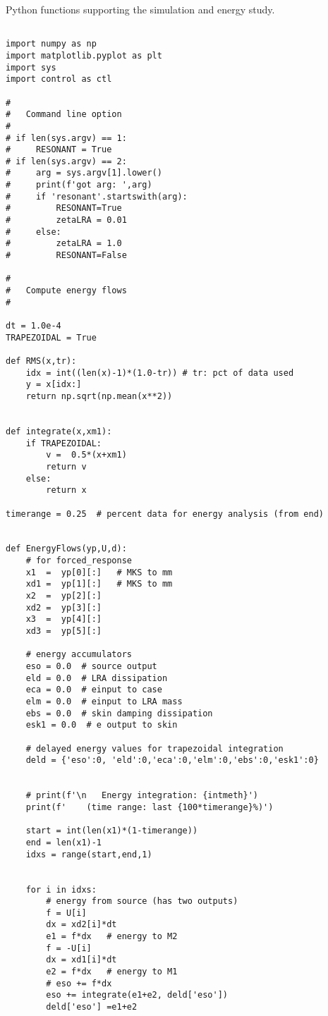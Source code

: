

\clearpage
\newpage
\begin{listing}[h]
    \caption{Python functions supporting the simulation and energy study.}\label{Listing2}
\end{listing}
\begin{verbatim}

import numpy as np
import matplotlib.pyplot as plt
import sys
import control as ctl

#
#   Command line option
#
# if len(sys.argv) == 1:
#     RESONANT = True
# if len(sys.argv) == 2:
#     arg = sys.argv[1].lower()
#     print(f'got arg: ',arg)
#     if 'resonant'.startswith(arg):
#         RESONANT=True
#         zetaLRA = 0.01
#     else:
#         zetaLRA = 1.0
#         RESONANT=False

#
#   Compute energy flows
#

dt = 1.0e-4
TRAPEZOIDAL = True

def RMS(x,tr):
    idx = int((len(x)-1)*(1.0-tr)) # tr: pct of data used
    y = x[idx:]
    return np.sqrt(np.mean(x**2))


def integrate(x,xm1):
    if TRAPEZOIDAL:
        v =  0.5*(x+xm1)
        return v
    else:
        return x

timerange = 0.25  # percent data for energy analysis (from end)


def EnergyFlows(yp,U,d):
    # for forced_response
    x1  =  yp[0][:]   # MKS to mm
    xd1 =  yp[1][:]   # MKS to mm
    x2  =  yp[2][:]
    xd2 =  yp[3][:]
    x3  =  yp[4][:]
    xd3 =  yp[5][:]

    # energy accumulators
    eso = 0.0  # source output
    eld = 0.0  # LRA dissipation
    eca = 0.0  # einput to case
    elm = 0.0  # einput to LRA mass
    ebs = 0.0  # skin damping dissipation
    esk1 = 0.0  # e output to skin

    # delayed energy values for trapezoidal integration
    deld = {'eso':0, 'eld':0,'eca':0,'elm':0,'ebs':0,'esk1':0}


    # print(f'\n   Energy integration: {intmeth}')
    print(f'    (time range: last {100*timerange}%)')

    start = int(len(x1)*(1-timerange))
    end = len(x1)-1
    idxs = range(start,end,1)


    for i in idxs:
        # energy from source (has two outputs)
        f = U[i]
        dx = xd2[i]*dt
        e1 = f*dx   # energy to M2
        f = -U[i]
        dx = xd1[i]*dt
        e2 = f*dx   # energy to M1
        # eso += f*dx
        eso += integrate(e1+e2, deld['eso'])
        deld['eso'] =e1+e2


\end{verbatim}
